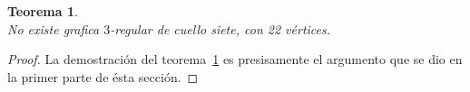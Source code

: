 \documentclass[11pt]{book}
\newtheorem{theorem}{Teorema}
\theoremstyle{definition}
\begin{document}

\begin{theorem}\textbf{}\\
\label{Noexiste(3,7)de22}
No existe grafica $3$-regular de cuello siete, con 22 vértices.
\end{theorem}

\begin{proof} La demostración del teorema~\ref{Noexiste(3,7)de22} es
  presisamente el argumento que se dio en la primer parte de ésta
  sección.
\end{proof} 
\end{document}

